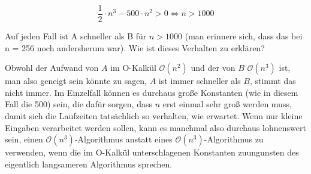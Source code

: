 \documentclass{bschlangaul-aufgabe}
\begin{document}
\begin{enumerate}
\begin{liAntwort}
\begin{displaymath}
\frac{1}{2} \cdot n^3 - 500 \cdot n^2 > 0 \Leftrightarrow n > 1000
\end{displaymath}

Auf jeden Fall ist A schneller als B für $n > 1000$ (man erinnere sich,
dass das bei n = 256 noch andersherum war). Wie ist dieses Verhalten zu
erklären?

Obwohl der Aufwand von $A$ im O-Kalkül $\mathcal{O}(n^2)$ und der von
$B$ $\mathcal{O}(n^3)$ ist, man also geneigt sein könnte zu sagen, $A$
ist immer schneller als $B$, stimmt das nicht immer. Im Einzelfall
können es durchaus große Konstanten (wie in diesem Fall die 500) sein,
die dafür sorgen, dass $n$ erst einmal sehr groß werden muss, damit sich
die Laufzeiten tatsächlich so verhalten, wie erwartet. Wenn nur kleine
Eingaben verarbeitet werden sollen, kann es manchmal also durchaus
lohnenswert sein, einen $\mathcal{O}(n^3)$-Algorithmus anstatt eines
$\mathcal{O}(n^3)$-Algorithmus zu verwenden, wenn die im O-Kalkül
unterschlagenen Konstanten zuungunsten des eigentlich langsameren
Algorithmus sprechen.
\end{liAntwort}

\end{enumerate}
\end{document}
